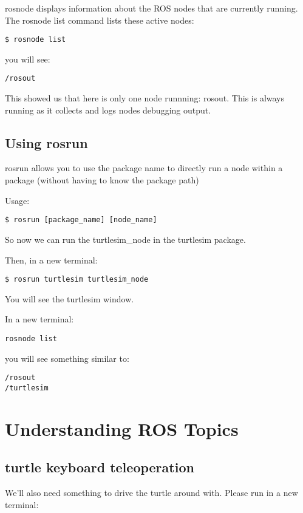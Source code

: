 rosnode displays information about the ROS nodes that are currently running. The rosnode list command lists these active nodes:

\begin{lstlisting}[breaklines=true languages=bash]
$ rosnode list
\end{lstlisting}

you will see:
\begin{lstlisting}[breaklines=true languages=bash]
/rosout
\end{lstlisting}

This showed us that here is only one node runnning: rosout. This is always running as it collects and logs nodes debugging output.

\subsection{Using rosrun}
rosrun allows you to use the package name to directly run a node within a package (without having to know the package path)

Usage:
\begin{lstlisting}[breaklines=true languages=bash]
$ rosrun [package_name] [node_name]
\end{lstlisting}

So now we can run the turtlesim\_node in the turtlesim package.

Then, in a new terminal:

\begin{lstlisting}[breaklines=true languages=bash]
$ rosrun turtlesim turtlesim_node
\end{lstlisting}

You will see the turtlesim window.

In a new terminal:

\begin{lstlisting}[breaklines=true languages=bash]
rosnode list
\end{lstlisting}

you will see something similar to:
\begin{lstlisting}[breaklines=true languages=bash]
/rosout
/turtlesim
\end{lstlisting}

\section{Understanding ROS Topics}
\subsection{turtle keyboard teleoperation}
We'll also need something to drive the turtle around with. Please run in a new terminal:

